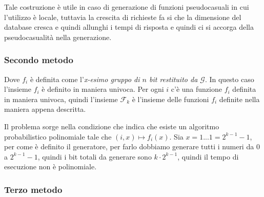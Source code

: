 Tale costruzione è utile in caso di generazione di funzioni pseudocasuali 
in cui l'utilizzo è locale, tuttavia la crescita di richieste fa si che 
la dimensione del database cresca e quindi allunghi i tempi di risposta e 
quindi ci si accorga della pseudocasualità nella generazione.
\subsubsection{Secondo metodo}
\begin{figure}[H]
  \centering
\end{figure}
Dove $f_i$ è definita come l'\textit{x-esimo gruppo di $n$ bit restituito da $\mathcal{G}$}.
In questo caso l'insieme $f_i$ è definito in maniera univoca. Per ogni $i$ c'è 
una funzione $f_i$ definita in maniera univoca, quindi l'insieme $\mathcal{F}_k$ è 
l'insieme delle funzioni $f_i$ definite nella maniera appena descritta.

Il problema sorge nella condizione che indica che esiste un algoritmo probabilistico
polinomiale tale che $(i,x) \mapsto f_i(x)$. Sia $x=1...1 = 2^{k-1} - 1$, per come è 
definito il generatore, per farlo dobbiamo generare tutti i numeri da $0$ a $2^{k-1} - 1$,
quindi i bit totali da generare sono $k \cdot 2^{k-1}$, quindi il tempo di esecuzione
non è polinomiale.

\subsubsection{Terzo metodo}

